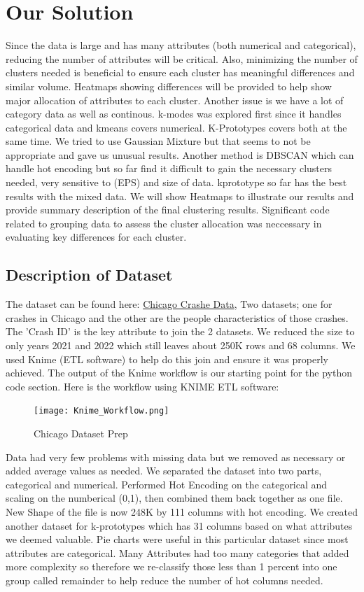 \documentclass[conference]{IEEEtran}
\begin{document}
\section{Our Solution}
Since the data is large and has many attributes (both numerical and categorical), reducing the number of attributes will be critical.  Also, minimizing the number of clusters needed is beneficial to ensure each cluster has meaningful differences and similar volume. Heatmaps showing differences will be provided to help show major allocation of attributes to each cluster. Another issue is we have a lot of category data as well as continous.  k-modes was explored first since it handles categorical data and kmeans covers numerical.  K-Prototypes covers both at the same time.  We tried to use Gaussian Mixture but that seems to not be appropriate and gave us unusual results.  Another method is DBSCAN which can handle hot encoding but so far find it difficult to gain the necessary clusters needed, very sensitive to  (EPS) and size of data.  kprototype so far has the best results with the mixed data.  We will show Heatmaps to illustrate our results and provide summary description of the final clustering results.  Significant code related to grouping data to assess the cluster allocation was neccessary in evaluating key differences for each cluster.

\subsection{Description of Dataset}
The dataset can be found here: \href{https://data.cityofchicago.org/Transportation/Traffic-Crashes-Crashes/85ca-t3if}{Chicago Crashe Data}, Two datasets; one for crashes in Chicago and the other are the people characteristics of those crashes.  The 'Crash ID' is the key attribute to join the 2 datasets.  We reduced the size to only years 2021 and 2022 which still leaves about 250K rows and 68 columns.  We used Knime (ETL software) to help do this join and ensure it was properly achieved. The output of the Knime workflow is our starting point for the python code section.
Here is the workflow using KNIME ETL software:
\begin{figure}[!h]
	\texttt{[image: Knime\_Workflow.png]}
	\caption{Chicago Dataset Prep}
	\label{fig: KNIME ETL for Chicago Dataset for Crashes and People involved}
 \end{figure}

Data had very few problems with missing data but we removed as necessary or added average values as needed. We separated the dataset into two parts, categorical and numerical.  Performed Hot Encoding on the categorical and scaling on the numberical (0,1), then combined them back together as one file.  New Shape of the file is now  248K by 111 columns with hot encoding. We created another dataset for k-prototypes which has 31 columns based on what attributes we deemed valuable.  Pie charts were useful in this particular dataset since most attributes are categorical.  Many Attributes had too many categories that added more complexity so therefore we re-classify those less than 1 percent into one group called remainder to help reduce the number of hot columns needed. \linebreak
\end{document}
